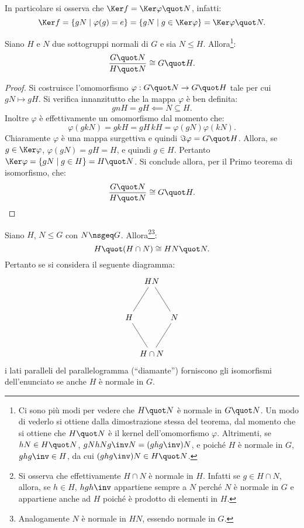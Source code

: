 \documentclass[12pt]{scrartcl}
\begin{document}
	In particolare si osserva che $\Ker f = \Ker \varphi \quot N$,
	infatti:
	\[ \Ker f = \{ gN \mid \varphi(g) = e \} = \{ gN \mid g \in \Ker \varphi \} = \Ker \varphi \quot N.
	 \]
	
	\begin{theorem}
		Siano $H$ e $N$ due sottogruppi normali di $G$ e sia
		$N \leq H$. Allora\footnote{
			Ci sono più modi per vedere che $H \quot N$ è
			normale in $G \quot N$. Un modo di vederlo si
			ottiene dalla dimostrazione stessa del teorema,
			dal momento che si ottiene che $H \quot N$ è
			il kernel dell'omomorfismo $\varphi$. Altrimenti,
			se $hN \in H \quot N$, $gN hN g\inv N = (ghg\inv)N$,
			e poiché $H$ è normale in $G$, $ghg\inv \in H$, da
			cui $(ghg\inv)N \in H \quot N$.
		}:
		\[ \frac{G \quot N}{H \quot N} \cong G \quot H. \]
	\end{theorem}
	
	\begin{proof}
		Si costruisce l'omomorfismo $\varphi : G \quot N \to G \quot H$ tale per cui $gN \mapsto gH$. Si verifica innanzitutto
		che la mappa $\varphi$ è ben definita:
		\[ gnH = gH \impliedby N \subseteq H. \]
		Inoltre $\varphi$ è effettivamente un omomorfismo dal momento
		che:
		\[ \varphi(gkN) = gkH = gH \, kH = \varphi(gN) \varphi(kN).  \]
		Chiaramente $\varphi$ è una mappa surgettiva e quindi
		$\Im \varphi = G \quot H$.
		Allora, se $g \in \Ker \varphi$, $\varphi(gN) = gH = H$, e quindi $g \in H$. Pertanto $\Ker \varphi = \{ 
		gN \mid g \in H 
		\} = H \quot N$. Si conclude allora, per il Primo teorema
		di isomorfismo, che:
		\[ \frac{G \quot N}{H \quot N} \cong G \quot H. \]
	\end{proof}
	
	\begin{theorem}
		Siano $H$, $N \leq G$ con $N \nsgeq G$. Allora\footnote{
			Si osserva che effettivamente $H \cap N$ è normale in
			$H$. Infatti se $g \in H \cap N$, allora, se
			$h \in H$, $h g h\inv$ appartiene sempre a $N$
			perché $N$ è normale in $G$ e appartiene anche
			ad $H$ poiché è prodotto di elementi in $H$.	
		}\footnote{
			Analogamente $N$ è normale in $HN$, essendo
			normale in $G$.
		}:
		\[ H \quot (H \cap N) \cong HN \quot N. \]
		Pertanto se si considera il seguente diagramma:
		\[\begin{tikzcd}[column sep=0em,row sep=3em]
			& HN \arrow[dl,dash] \arrow[dr,dash] \\
			H \arrow[dr,dash] && N \arrow[dl,dash] \\
			& H\cap N
		\end{tikzcd}\]
		i lati paralleli del parallelogramma (``diamante'')
		forniscono gli isomorfismi dell'enunciato se anche
		$H$ è normale in $G$.
	\end{theorem}
	
\end{document}
